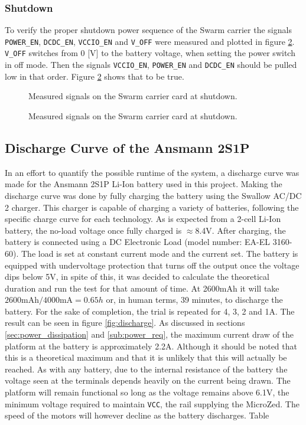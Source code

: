 \subsubsection*{Shutdown}
To verify the proper shutdown power sequence of the Swarm carrier the signals \texttt{POWER\_EN}, \texttt{DCDC\_EN}, \texttt{VCCIO\_EN} and \texttt{V\_OFF} were measured and plotted in figure \ref{fig:shutdown}.
\texttt{V\_OFF} switches from 0 [V] to the battery voltage, when setting the power switch in off mode.
Then the signals \texttt{VCCIO\_EN}, \texttt{POWER\_EN} and \texttt{DCDC\_EN} should be pulled low in that order.
Figure \ref{fig:shutdown} shows that to be true.

\begin{figure}
	\centering
    
	\caption{Measured signals on the Swarm carrier card at shutdown.}
	\label{fig:shutdown}
\end{figure}


\begin{figure}
	\centering
    
	\caption{Measured signals on the Swarm carrier card at shutdown.}
	\label{fig:shutdown}
\end{figure}

\subsection{Discharge Curve of the Ansmann 2S1P} %
\label{sub:discharge_curve_of_the_ansmann_2s1p}
In an effort to quantify the possible runtime of the system, a discharge curve was made for the Ansmann 2S1P Li-Ion battery used in this project.
Making the discharge curve was done by fully charging the battery using the Swallow AC/DC 2 charger.
This charger is capable of charging a variety of batteries, following the specific charge curve for each technology.
As is expected from a 2-cell Li-Ion battery, the no-load voltage once fully charged is $\approx$8.4V.
After charging, the battery is connected using a DC Electronic Load (model number: EA-EL 3160-60).
The load is set at constant current mode and the current set.
The battery is equipped with undervoltage protection that turns off the output once the voltage dips below 5V, in spite of this, it was decided to calculate the theoretical duration and run the test for that amount of time.
At 2600mAh it will take $2600\text{mAh}/4000\text{mA}=0.65h$ or, in human terms, 39 minutes, to discharge the battery.
For the sake of completion, the trial is repeated for 4, 3, 2 and 1A.
The result can be seen in figure \ref{fig:discharge}.
As discussed in sections \ref{sec:power_dissipation} and \ref{sub:power_req}, the maximum current draw of the platform at the battery is approximately 2.2A.
Although it should be noted that this is a theoretical maximum and that it is unlikely that this will actually be reached.
As with any battery, due to the internal resistance of the battery the voltage seen at the terminals depends heavily on the current being drawn.
The platform will remain functional so long as the voltage remains above 6.1V, the minimum voltage required to maintain \texttt{VCC}, the rail supplying the MicroZed.
The speed of the motors will however decline as the battery discharges.
Table 

